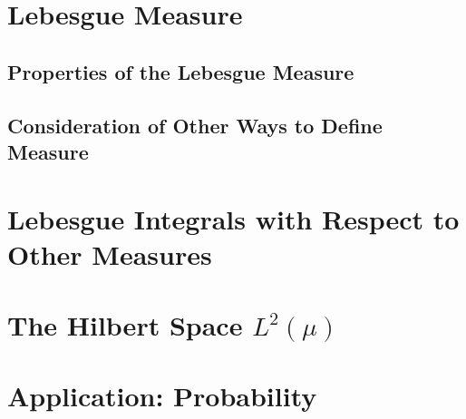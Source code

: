 \documentclass{article}
\theoremstyle{plain}
\begin{document}
\section*{Lebesgue Measure}
\subsection*{Properties of the Lebesgue Measure}
\subsection*{Consideration of Other Ways to Define Measure}

\section*{Lebesgue Integrals with Respect to Other Measures}

\section*{The Hilbert Space $ L^{2}\left(\mu\right) $}

\section*{Application: Probability}
\end{document}
